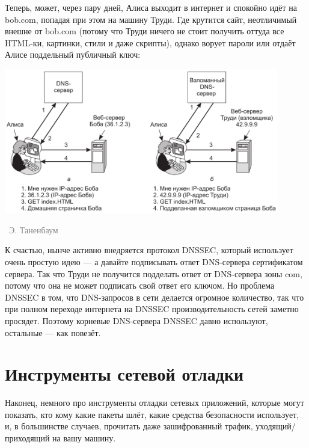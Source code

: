 \documentclass[a5paper]{article}
\newcommand{\attribution}[1] {
\vspace{-5mm}\begin{flushright}\begin{scriptsize}\textcolor{gray}{\textcopyright\, #1}\end{scriptsize}\end{flushright}
}
\begin{document}
Теперь, может, через пару дней, Алиса выходит в интернет и спокойно идёт на bob.com, попадая при этом на машину Труди. Где крутится сайт, неотличимый внешне от bob.com (потому что Труди ничего не стоит получить оттуда все HTML-ки, картинки, стили и даже скрипты), однако ворует пароли или отдаёт Алисе поддельный публичный ключ:

\begin{center}
    \includegraphics[width=0.9\textwidth]{dnsSpoofingResult.png}
    \attribution{Э. Таненбаум}
\end{center}

К счастью, нынче активно внедряется протокол DNSSEC, который использует очень простую идею --- а давайте подписывать ответ DNS-сервера сертификатом сервера. Так что Труди не получится подделать ответ от DNS-сервера зоны com, потому что она не может подписать свой ответ его ключом. Но проблема DNSSEC в том, что DNS-запросов в сети делается огромное количество, так что при полном переходе интернета на DNSSEC производительность сетей заметно просядет. Поэтому корневые DNS-сервера DNSSEC давно используют, остальные --- как повезёт.

\section{Инструменты сетевой отладки}

Наконец, немного про инструменты отладки сетевых приложений, которые могут показать, кто кому какие пакеты шлёт, какие средства безопасности использует, и, в большинстве случаев, прочитать даже зашифрованный трафик, уходящий/приходящий на вашу машину. 
\end{document}
